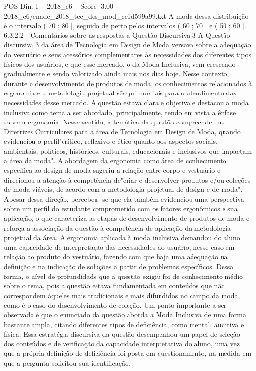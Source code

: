 \begin{textsample}{POS Dim 1 – 2018\_c6 – Score -3.00 – 2018\_c6/enade\_2018\_tec\_des\_mod\_ce1d599a99.txt}
A moda dessa distribuição é o intervalo ( 70 ; 80 ], seguido de perto pelos intervalos ( 60 ; 70 ] e ( 50 ; 60 ]. 6.3.2.2 - Comentários sobre as respostas à Questão Discursiva 3 A Questão discursiva 3 da área de Tecnologia em Design de Moda versava sobre a adequação do vestuário e seus acessórios complementares às necessidades dos diferentes tipos físicos dos usuários, e que esse mercado, o da Moda Inclusiva, vem crescendo gradualmente e sendo valorizado ainda mais nos dias hoje.
Nesse contexto, durante o desenvolvimento de produtos de moda, os conhecimentos relacionados à ergonomia e a metodologia projetual são primordiais para o atendimento das necessidades desse mercado.
A questão estava clara e objetiva e destacou a moda inclusiva como tema a ser abordado, principalmente, tendo em vista a ênfase sobre a ergonomia.
Nesse sentido, a temática da questão compreendeu as Diretrizes Curriculares para a área de Tecnologia em Design de Moda, quando evidenciou o perfil"crítico, reflexivo e ético quanto aos aspectos sociais, ambientais, políticos, históricos, culturais, educacionais e inclusivos que impactam a área da moda".
A abordagem da ergonomia como área de conhecimento específica ao design de moda sugeriu a relação entre corpo e vestuário e direcionou a atenção à competência de"criar e desenvolver produtos e/ou coleções de moda viáveis, de acordo com a metodologia projetual de design e de moda".
Apesar dessa direção, percebeu -se que ela também evidenciou uma perspectiva sobre um perfil do estudante comprometido com os fatores ergonômicos e sua aplicação, o que caracteriza as etapas de desenvolvimento de produtos de moda e reforça a associação da questão à competência de aplicação da metodologia projetual da área.
A ergonomia aplicada à moda inclusiva demandou do aluno uma capacidade de interpretação das necessidades do usuário, nesse caso em relação ao produto do vestuário, fazendo com que haja uma adequação na definição e na indicação de soluções a partir de problemas específicos.
Dessa forma, o nível de profundidade que a questão exigiu foi de conhecimento médio sobre o tema, pois a questão estava fundamentada em conteúdos que não correspondem àqueles mais tradicionais e mais difundidos no campo da moda, como é o caso do desenvolvimento de coleção.
Um ponto importante a ser observado é que o enunciado da questão aborda a Moda Inclusiva de uma forma bastante ampla, citando diferentes tipos de deficiência, como mental, auditiva e física.
Essa estratégia discursiva da questão desempenhou um papel de seleção dos conteúdos e de verificação da capacidade interpretativa do aluno, uma vez que a própria definição de deficiência foi posta em questionamento, na medida em que a pergunta solicitou sua identificação.

\end{textsample}
